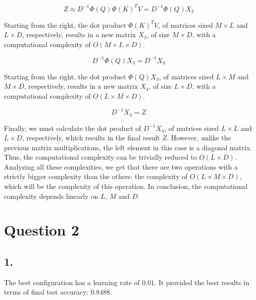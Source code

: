\documentclass[11pt]{article}
\begin{document}
\[
    Z \approx D^{-1} \Phi(Q) \Phi(K)^T V = D^{-1} \Phi(Q) X_3
\]

Starting from the right, the dot product $\Phi(K)^T V$, of matrices sized $M\times L$ and $L\times D$, respectively, results in a new matrix $X_{3}$, of size $M \times D$, with a computational complexity of $O(M\times L \times D)$.

\[
    D^{-1} \Phi(Q) X_3 = D^{-1} X_4
\]

Starting from the right, the dot product $\Phi(Q) X_3$, of matrices sized $L\times M$ and $M\times D$, respectively, results in a new matrix $X_{4}$, of size $L \times D$, with a computational complexity of $O(L\times M \times D)$.

\[
    D^{-1} X_4 = Z
\]

Finally, we must calculate the dot product of $D^{-1} X_4$, of matrices sized $L\times L$ and $L\times D$, respectively, which results in the final result $Z$. However, unlike the previous matrix multiplications, the left element in this case is a diagonal matrix. Thus, the computational complexity can be trivially reduced to $O(L\times D)$. Analyzing all these complexities, we get that there are two operations with a strictly bigger complexity than the others: the complexity of $O(L\times M\times D)$, which will be the complexity of this operation. In conclusion, the computational complexity depends linearly on $L$, $M$ and $D$.

\section*{Question 2}

\subsection*{1.}

The best configuration has a learning rate of $0.01$. It provided the best results in terms of final test accuracy: $0.8488$.
\end{document}
